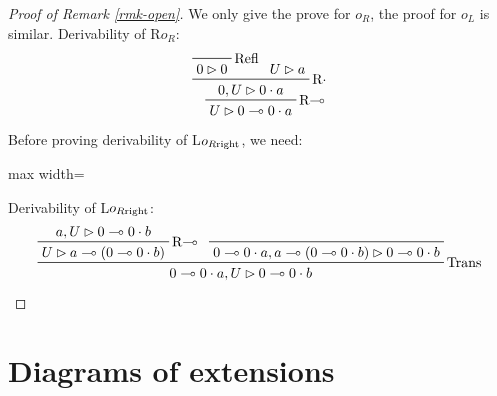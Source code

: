 \documentclass[runningheads]{llncs}
\begin{document}
\begin{proof}[Proof of Remark \ref{rmk-open}]
	We only give the prove for $o_R$, the proof for $o_L$ is similar.
	Derivability of R$o_R$:
	\[
	\prftree[r]{\textnormal{R$\multimap$}}{
		\prftree[r]{\textnormal{R$\cdot$}}{
			\prftree[r]{Refl}{0\rhd 0}
		}{
			\prfassumption{U\rhd a}
		}{0,U\rhd 0\cdot a}
	}{U\rhd 0\multimap0\cdot a}
	\]
	Before proving derivability of L$o_{R\textnormal{right}}$, we need:

    \begin{adjustbox}{max width=\textwidth}
\end{adjustbox}
	
	Derivability of L$o_{R\textnormal{right}}$:
	\[
	\prftree[r]{Trans}{
		\prftree[r]{\textnormal{R$\multimap$}}{a,U\rhd0\multimap0\cdot b}{U\rhd a\multimap(0\multimap0\cdot b)}
	}{
		\prftree{0\multimap0\cdot a,a\multimap(0\multimap0\cdot b)\rhd0\multimap0\cdot b}
	}{0\multimap 0\cdot a,U\rhd 0\multimap 0\cdot b}
	\qedhere
	\]
\end{proof}

\section{Diagrams of extensions}
\label{append-diagrams}
\end{document}
